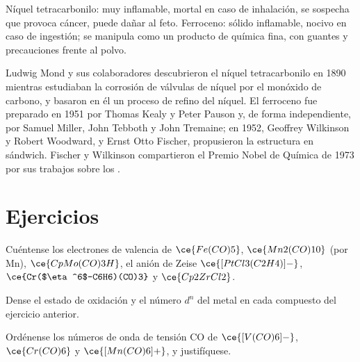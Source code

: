 \begin{safety}{}
Níquel tetracarbonilo: muy inflamable, mortal en caso de inhalación, se sospecha que provoca cáncer,
puede dañar al feto. Ferroceno: sólido inflamable, nocivo en caso de ingestión;
se manipula como un producto de química fina, con guantes y precauciones frente al polvo.
\end{safety}

\begin{history}
Ludwig Mond y sus colaboradores descubrieron el níquel tetracarbonilo en 1890 mientras
estudiaban la corrosión de válvulas de níquel por el monóxido de carbono, y basaron en él un
proceso de refino del níquel. El ferroceno fue preparado en 1951 por Thomas Kealy y Peter
Pauson y, de forma independiente, por Samuel Miller, John Tebboth y John Tremaine; en 1952,
Geoffrey Wilkinson y Robert Woodward, y Ernst Otto Fischer, propusieron la
estructura en sándwich. Fischer y Wilkinson compartieron el Premio Nobel de
Química de 1973 por sus trabajos sobre los .
\end{history}

\section{Ejercicios}

\begin{exercise}[$\star$]\label{exo:b3:organometallic-bonding:1}
Cuéntense los electrones de valencia de $\ce{Fe(CO)5}$, $\ce{Mn2(CO)10}$ (por Mn), $\ce{CpMo(CO)3H}$, el anión de Zeise
$\ce{[PtCl3(C2H4)]-}$, $\ce{Cr($\eta^6$-C6H6)(CO)3}$ y $\ce{Cp2ZrCl2}$.
\end{exercise}

\begin{exercise}[$\star$]\label{exo:b3:organometallic-bonding:2}
Dense el estado de oxidación y el número $d^n$ del metal en cada compuesto del
ejercicio anterior.
\end{exercise}

\begin{exercise}[$\star$]\label{exo:b3:organometallic-bonding:3}
Ordénense los números de onda de tensión CO de $\ce{[V(CO)6]-}$, $\ce{Cr(CO)6}$ y $\ce{[Mn(CO)6]+}$, y justifíquese.
\end{exercise}

